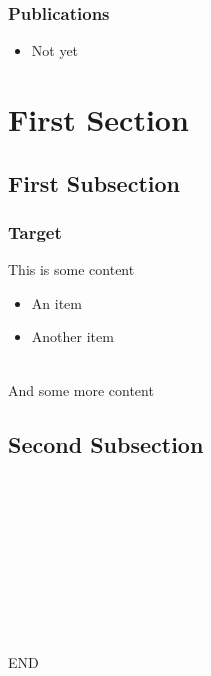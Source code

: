 \documentclass[t]{beamer}
\begin{document}
\date{29.03.2012}

\frame[plain,c]{\titlepage} %


\begin{frame}
	\frametitle{Publications}
	\begin{itemize}
		\item Not yet
	\end{itemize}
\end{frame}

\section{First Section}
\subsection{First Subsection}

\begin{frame}
	\frametitle{Target}
	
	This is some content
	\begin{itemize}
		\item An item
		\item Another item
	\end{itemize}
 	
 	~\\
	
	And some more content
\end{frame}

\subsection{Second Subsection}

\begin{frame}[plain]
	\begin{center}
		~\\~\\~\\~\\~\\~\\~\\~\\~\\
		END
	\end{center}
\end{frame}
\end{document}
